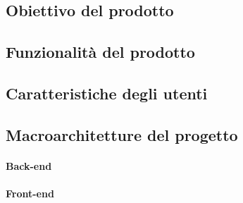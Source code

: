 \subsection{Obiettivo del prodotto}
\label{sub:obiettivo_del_prodotto}

\subsection{Funzionalità del prodotto}
\label{sub:funzionalita_del_prodotto}

\subsection{Caratteristiche degli utenti}
\label{sub:caratteristiche_degli_utenti}

\subsection{Macroarchitetture del progetto}
\label{sub:macroarchitetture_del_progetto}
\paragraph{Back-end}
\label{par:back-end}

\paragraph{Front-end}
\label{par:front-end}

